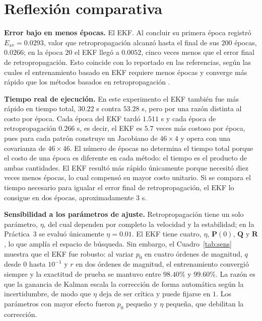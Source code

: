 \documentclass[conference]{IEEEtran}
\begin{document}
\section{Reflexión comparativa}

\textbf{Error bajo en menos épocas.} El EKF. Al concluir su primera época
registró $E_{\text{av}}=0.0293$, valor que retropropagación alcanzó hasta
el final de sus $200$ épocas, $0.0266$; en la época $20$ el EKF llegó a
$0.0052$, cinco veces menos que el error final de retropropagación. Esto
coincide con lo reportado en las referencias, según las cuales el
entrenamiento basado en EKF requiere menos épocas y converge más rápido que
los métodos basados en retropropagación \cite{b2,b3,b7}.

\textbf{Tiempo real de ejecución.} En este experimento el EKF también fue
más rápido en tiempo total, $30.22$ s contra $53.28$ s, pero por una razón
distinta al costo por época. Cada época del EKF tardó $1.511$ s y cada
época de retropropagación $0.266$ s, es decir, el EKF es $5.7$ veces más
costoso por época, pues para cada patrón construye un Jacobiano de
$46\times4$ y opera con una covarianza de $46\times46$. El número de épocas
no determina el tiempo total porque el costo de una época es diferente en
cada método: el tiempo es el producto de ambas cantidades. El EKF resultó
más rápido únicamente porque necesitó diez veces menos épocas, lo cual
compensó su mayor costo unitario. Si se compara el tiempo necesario para
igualar el error final de retropropagación, el EKF lo consigue en dos
épocas, aproximadamente $3$ s.

\textbf{Sensibilidad a los parámetros de ajuste.} Retropropagación tiene un
solo parámetro, $\eta$, del cual dependen por completo la velocidad y la
estabilidad; en la Práctica~3 se evaluó únicamente $\eta=0.01$. El EKF
tiene cuatro, $\eta$, $\mathbf{P}(0)$, $\mathbf{Q}$ y $\mathbf{R}$, lo que
amplía el espacio de búsqueda. Sin embargo, el Cuadro~\ref{tab:sens}
muestra que el EKF fue robusto: al variar $p_0$ en cuatro órdenes de
magnitud, $q$ desde $0$ hasta $10^{-1}$ y $r$ en dos órdenes de magnitud,
el entrenamiento convergió siempre y
la exactitud de prueba se mantuvo entre $98.40\%$ y $99.60\%$. La razón es
que la ganancia de Kalman escala la corrección de forma automática según la
incertidumbre, de modo que $\eta$ deja de ser crítica y puede fijarse en
$1$. Los parámetros con mayor efecto fueron $p_0$ pequeño y $\eta$ pequeña,
que debilitan la corrección.
\end{document}
